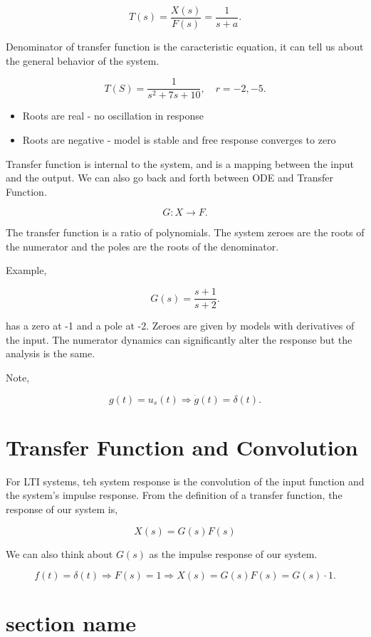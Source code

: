 \documentclass[12pt, a4paper]{report}
\begin{document}
  \[
      T(s) = \frac{X(s)}{F(s)} = \frac{1}{s+a}
    .\]

  Denominator of transfer function is the caracteristic equation, it can tell us about the general behavior of the system.

  \[
      T(S) = \frac{1}{s ^2 + 7s + 10}, \quad r = -2, -5
    .\]

  \begin{itemize}
    \item Roots are real - no oscillation in response
    \item Roots are negative - model is stable and free response converges to zero
  \end{itemize}



  Transfer function is internal to the system, and is a mapping between the input and the output. We can also go back and forth between ODE and Transfer Function.

  \[
      G: X \rightarrow F
    .\]

  The transfer function is a ratio of polynomials. The system zeroes are the roots of the numerator and the poles are the roots of the denominator.

  Example,

  \[
      G(s) = \frac{s + 1}{s + 2}
    .\]

  has a zero at -1 and a pole at -2. Zeroes are given by models with derivatives of the input. The numerator dynamics can significantly alter the response but the analysis is the same.

  Note,

  \[
      g(t) = u_s(t) \Rightarrow \dot g(t) = \delta (t)
    .\]

  \section{Transfer Function and Convolution}

  For LTI systems, teh system response is the convolution of the input function and the system's impulse response. From the definition of a transfer function, the response of our system is,

  \begin{equation}
    X(s) = G(s)F(s)
  \end{equation}

  We can also think about $ G(s) $ as the impulse response of our system.

  \[
      f(t) = \delta (t) \Rightarrow F(s) = 1 \Rightarrow X(s) = G(s)F(s) = G(s) \cdot 1
    .\]



  \section{section name}
\end{document}
